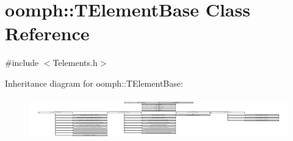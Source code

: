 \hypertarget{classoomph_1_1TElementBase}{}\section{oomph\+:\+:T\+Element\+Base Class Reference}
\label{classoomph_1_1TElementBase}


{\ttfamily \#include $<$Telements.\+h$>$}

Inheritance diagram for oomph\+:\+:T\+Element\+Base\+:\begin{figure}[H]
\begin{center}
\leavevmode
\includegraphics[height=1.842105cm]{classoomph_1_1TElementBase}
\end{center}
\end{figure}
